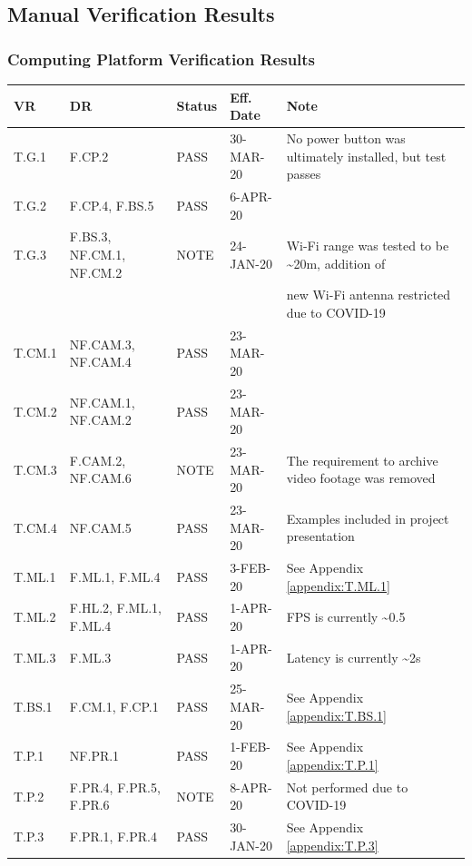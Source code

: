 \documentclass[10pt,letterpaper]{article}
\begin{document}
\subsection{Manual Verification Results}
\subsubsection{Computing Platform Verification Results}
\begin{table}[H]
	\centering
	\begin{tabular}{lllll}
	\hline
	\textbf{VR} & \textbf{DR} & \textbf{Status} & \textbf{Eff. Date} & \textbf{Note}\\
	\hline
	T.G.1 & F.CP.2 & PASS & 30-MAR-20  & No power button was ultimately installed, but test passes\\
	T.G.2 & F.CP.4, F.BS.5 & PASS & 6-APR-20 \\
	T.G.3 & F.BS.3, NF.CM.1, NF.CM.2 & NOTE & 24-JAN-20 & Wi-Fi range was tested to be \textasciitilde 20m, addition of \\ & & & & new Wi-Fi antenna restricted due to COVID-19 \\
	\hline
	T.CM.1 & NF.CAM.3, NF.CAM.4   & PASS   & 23-MAR-20 & \\
	T.CM.2 & NF.CAM.1, NF.CAM.2   & PASS   & 23-MAR-20 &  \\
	T.CM.3 & F.CAM.2, NF.CAM.6   & NOTE   & 23-MAR-20 & The requirement to archive video footage was removed \\
	T.CM.4 & NF.CAM.5   & PASS   & 23-MAR-20 & Examples included in project presentation \\
	\hline
	T.ML.1 & F.ML.1, F.ML.4 & PASS & 3-FEB-20 & See Appendix \ref{appendix:T.ML.1}\\
	T.ML.2 & F.HL.2, F.ML.1, F.ML.4 & PASS  & 1-APR-20 & FPS is currently \textasciitilde 0.5 \\
    T.ML.3 & F.ML.3 & PASS  & 1-APR-20 & Latency is currently \textasciitilde 2s\\
    \hline
    T.BS.1 & F.CM.1, F.CP.1 & PASS & 25-MAR-20 & See Appendix \ref{appendix:T.BS.1} \\
    \hline
    T.P.1 & NF.PR.1 & PASS   & 1-FEB-20 & See Appendix \ref{appendix:T.P.1}\\
    T.P.2 & F.PR.4, F.PR.5, F.PR.6 & NOTE & 8-APR-20 & Not performed due to COVID-19 \\
    T.P.3 & F.PR.1, F.PR.4 & PASS   & 30-JAN-20 & See Appendix \ref{appendix:T.P.3} \\
	\hline
	\end{tabular}
\end{table}
\end{document}
